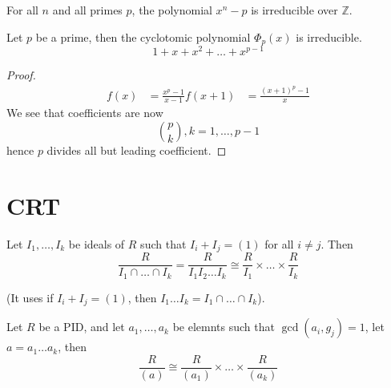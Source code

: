 \documentclass[openany]{book}
\newcommand{\Z}{\mathbb{Z}}
\begin{document}
\begin{example}
    For all $n$ and all primes $p$, the polynomial $x^n-p$ is irreducible over $\Z$.
\end{example}
\begin{example}
    Let $p$ be a prime, then the cyclotomic polynomial $\Phi_p(x)$ is irreducible.
    \begin{equation*}
        1+x+x^2+\dots+x^{p-1}
    \end{equation*}
\end{example}
\begin{proof}
    \begin{align*}
        f(x)&=\frac{x^p-1}{x-1}
        f(x+1)&=\frac{(x+1)^p-1}{x}
    \end{align*}
    We see that coefficients are now 
    \begin{equation*}
        \binom{p}{k}, k=1,\dots, p-1
    \end{equation*}
    hence $p$ divides all but leading coefficient.
\end{proof}







\section{CRT}
\begin{thm}[CRT]
    Let $I_1,\dots, I_k$ be ideals of $R$ such that $I_i+I_j=(1)$ for all $i\neq j$. Then 
    \begin{equation*}
        \frac{R}{I_1\cap\dots\cap I_k}=\frac{R}{I_1I_2\dots I_k}\cong\frac{R}{I_1}\times\dots\times\frac{R}{I_k}
    \end{equation*}

    (It uses if $I_i+I_j=(1)$, then $I_1\dots I_k=I_1\cap\dots\cap I_k$).
\end{thm}

\begin{prop}
    Let $R$ be a PID, and let $a_1,\dots, a_k$ be elemnts such that $\gcd(a_i,g_j)=1$, let $a=a_1\dots a_k$, then 
    \begin{equation*}
        \frac{R}{(a)}\cong\frac{R}{(a_1)}\times\dots\times\frac{R}{(a_k)}
    \end{equation*}
\end{prop}


\end{document}
